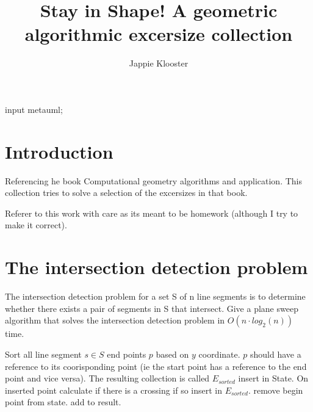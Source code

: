 \documentclass{article}
\begin{document}
\begin{empfile}
\begin{empcmds}
input metauml;
\end{empcmds}
\author{Jappie Klooster}
\title{Stay in Shape! A geometric algorithmic excersize collection}
\maketitle

\section{Introduction}
Referencing he book Computational geometry algorithms and application.
This collection  tries to solve a selection of the excersizes in that book.

Referer to this work with care as its meant to be homework (although
I try to make it correct).

\section{The intersection detection problem}
The intersection detection problem for a set S of n line segments is to
determine whether there exists a pair of segments in S that intersect. Give
a plane sweep algorithm that solves the intersection detection problem in
$O(n \cdot  log_2(n))$ time.

\begin{algorithmic}
	\State Sort all line segment $s \in S$ end points $p$ based on
		$y$ coordinate.
		$p$ should have a reference to its coorisponding point (ie the start
		point has a reference to the end point and vice versa). The resulting
		collection is called $E_{sorted}$
		\State
		 insert in State. On inserted point calculate
		if there is a crossing if so insert in $E_{sorted}$.
		\EndIf
		 remove begin point from state.
		\EndIf
		 add to result.
		\EndIf
	\EndFor
\end{algorithmic}

\end{empfile}
\end{document}
